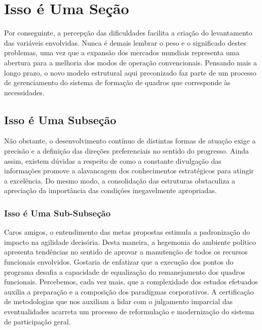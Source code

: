 \documentclass[fleqn]{profmat-cefet}
\begin{document}
\section{Isso é Uma Seção}
\label{sec:isso_e_uma_secao}

Por conseguinte, a percepção das dificuldades facilita a criação do levantamento
das variáveis envolvidas. Nunca é demais lembrar o peso e o significado destes
problemas, uma vez que a expansão dos mercados mundiais representa uma abertura
para a melhoria dos modos de operação convencionais. Pensando mais a longo
prazo, o novo modelo estrutural aqui preconizado faz parte de um processo de
gerenciamento do sistema de formação de quadros que corresponde às necessidades. 

\subsection{Isso é Uma Subseção}
\label{sec:isso_e_uma_subsecao}

Não obstante, o desenvolvimento contínuo de distintas formas de atuação exige a
precisão e a definição das direções preferenciais no sentido do progresso. Ainda
assim, existem dúvidas a respeito de como a constante divulgação das informações
promove a alavancagem dos conhecimentos estratégicos para atingir a excelência.
Do mesmo modo, a consolidação das estruturas obstaculiza a apreciação da
importância das condições inegavelmente apropriadas. 

\subsubsection{Isso é Uma Sub-Subseção}
\label{sec:isso_e_uma_subsubsecao}

Caros amigos, o entendimento das metas propostas estimula a padronização do
impacto na agilidade decisória. Desta maneira, a hegemonia do ambiente político
apresenta tendências no sentido de aprovar a manutenção de todos os recursos
funcionais envolvidos. Gostaria de enfatizar que a execução dos pontos do
programa desafia a capacidade de equalização do remanejamento dos quadros
funcionais. Percebemos, cada vez mais, que a complexidade dos estudos efetuados
auxilia a preparação e a composição dos paradigmas corporativos. A certificação
de metodologias que nos auxiliam a lidar com o julgamento imparcial das
eventualidades acarreta um processo de reformulação e modernização do sistema de
participação geral. 
\end{document}
